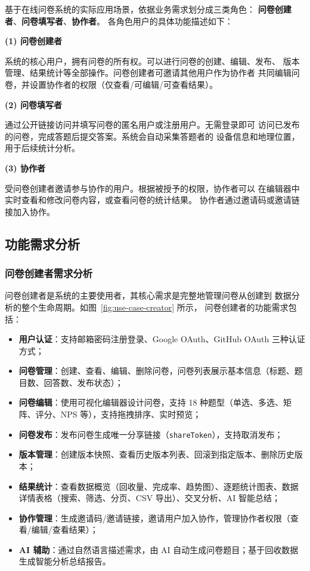 基于在线问卷系统的实际应用场景，依据业务需求划分成三类角色：
\textbf{问卷创建者}、\textbf{问卷填写者}、\textbf{协作者}。
各角色用户的具体功能描述如下：

\textbf{(1) 问卷创建者}

系统的核心用户，拥有问卷的所有权。可以进行问卷的创建、编辑、发布、
版本管理、结果统计等全部操作。问卷创建者可邀请其他用户作为协作者
共同编辑问卷，并设置协作者的权限（仅查看/可编辑/可查看结果）。

\textbf{(2) 问卷填写者}

通过公开链接访问并填写问卷的匿名用户或注册用户。无需登录即可
访问已发布的问卷，完成答题后提交答案。系统会自动采集答题者的
设备信息和地理位置，用于后续统计分析。

\textbf{(3) 协作者}

受问卷创建者邀请参与协作的用户。根据被授予的权限，协作者可以
在编辑器中实时查看和修改问卷内容，或查看问卷的统计结果。
协作者通过邀请码或邀请链接加入协作。

\subsection{功能需求分析}

\subsubsection{问卷创建者需求分析}

问卷创建者是系统的主要使用者，其核心需求是完整地管理问卷从创建到
数据分析的整个生命周期。如图~\ref{fig:use-case-creator} 所示，
问卷创建者的功能需求包括：

\begin{itemize}
  \item \textbf{用户认证}：支持邮箱密码注册登录、Google OAuth、GitHub OAuth 三种认证方式；
  \item \textbf{问卷管理}：创建、查看、编辑、删除问卷，问卷列表展示基本信息（标题、题目数、回答数、发布状态）；
  \item \textbf{问卷编辑}：使用可视化编辑器设计问卷，支持 18 种题型（单选、多选、矩阵、评分、NPS 等），支持拖拽排序、实时预览；
  \item \textbf{问卷发布}：发布问卷生成唯一分享链接（\texttt{shareToken}），支持取消发布；
  \item \textbf{版本管理}：创建版本快照、查看历史版本列表、回滚到指定版本、删除历史版本；
  \item \textbf{结果统计}：查看数据概览（回收量、完成率、趋势图）、逐题统计图表、数据详情表格（搜索、筛选、分页、CSV 导出）、交叉分析、AI 智能总结；
  \item \textbf{协作管理}：生成邀请码/邀请链接，邀请用户加入协作，管理协作者权限（查看/编辑/查看结果）；
  \item \textbf{AI 辅助}：通过自然语言描述需求，由 AI 自动生成问卷题目；基于回收数据生成智能分析总结报告。
\end{itemize}

